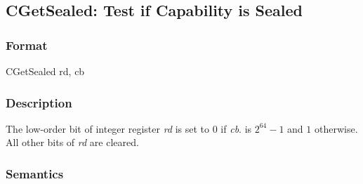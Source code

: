 \clearpage
{}
{}
\subsection*{CGetSealed: Test if Capability is Sealed}

\subsubsection*{Format}

CGetSealed rd, cb

\begin{center}
\end{center}

\subsubsection*{Description}

The low-order bit of integer register \emph{rd} is set to
$0$ if \emph{cb}.\cotype{} is $2^{64}-1$ and $1$ otherwise.
All other bits of \emph{rd} are cleared.

\subsubsection*{Semantics}


